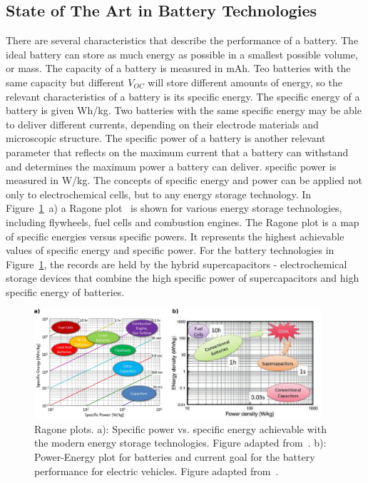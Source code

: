 \subsection{State of The Art in Battery Technologies}
There are several characteristics that describe the performance of a battery. The ideal battery can store as much energy as possible in a smallest possible volume, or mass. The capacity of a battery is measured in mAh. Teo batteries with the same capacity but different $V_{OC}$ will store different amounts of energy, so the relevant characteristics of a battery is its specific energy. The specific energy of a battery is given Wh/kg. Two batteries with the same specific energy may be able to deliver different currents, depending on their electrode materials and microscopic structure. The specific power of a battery is another relevant parameter that reflects on the maximum current that a battery can withstand and determines the maximum power a battery can deliver. specific power is measured in W/kg. The concepts of specific energy and power can be applied not only to electrochemical cells, but to any energy storage technology. In Figure~\ref{fig:ragone}~a) a Ragone plot~\cite{ragone,Reddy_book} is shown for various energy storage technologies, including flywheels, fuel cells and combustion engines. The Ragone plot is a map of specific energies versus specific powers. It represents the highest achievable values of specific energy and specific power. For the battery technologies in Figure~\ref{fig:ragone}, the records are held by the hybrid supercapacitors - electrochemical storage devices that combine the high specific power of supercapacitors and high specific energy of batteries.

\begin{figure}[h]
\center
	\includegraphics[width=0.95\textwidth]{./introduction/figures/ragone.pdf}
	\caption{Ragone plots. a): Specific power vs. specific energy achievable with the modern energy storage technologies. Figure adapted from~\cite{Moura_2010}. b): Power-Energy plot for batteries and current goal for the battery performance for electric vehicles. Figure adapted from~\cite{Feng_2010}.}
	\label{fig:ragone}
\end{figure}


